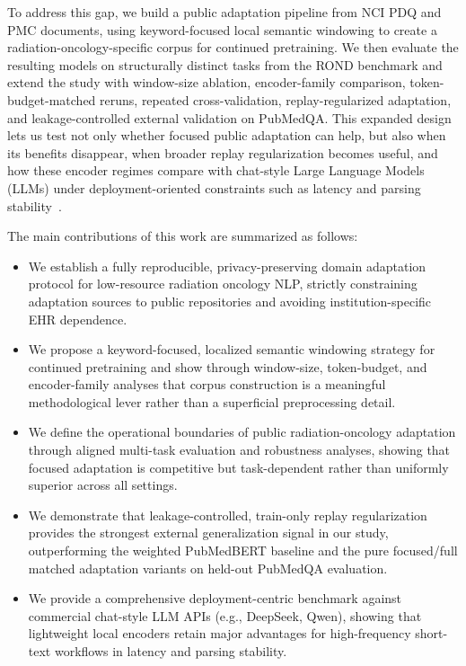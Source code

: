 \documentclass[a4paper,fleqn]{cas-dc}
\begin{document}
To address this gap, we build a public adaptation pipeline from NCI PDQ and PMC documents, using keyword-focused local semantic windowing to create a radiation-oncology-specific corpus for continued pretraining. We then evaluate the resulting models on structurally distinct tasks from the ROND benchmark and extend the study with window-size ablation, encoder-family comparison, token-budget-matched reruns, repeated cross-validation, replay-regularized adaptation, and leakage-controlled external validation on PubMedQA. This expanded design lets us test not only whether focused public adaptation can help, but also when its benefits disappear, when broader replay regularization becomes useful, and how these encoder regimes compare with chat-style Large Language Models (LLMs) under deployment-oriented constraints such as latency and parsing stability~\cite{jiang2023health, moor2023foundation}.

The main contributions of this work are summarized as follows:
\begin{itemize}
	\item We establish a fully reproducible, privacy-preserving domain adaptation protocol for low-resource radiation oncology NLP, strictly constraining adaptation sources to public repositories and avoiding institution-specific EHR dependence.
	\item We propose a keyword-focused, localized semantic windowing strategy for continued pretraining and show through window-size, token-budget, and encoder-family analyses that corpus construction is a meaningful methodological lever rather than a superficial preprocessing detail.
	\item We define the operational boundaries of public radiation-oncology adaptation through aligned multi-task evaluation and robustness analyses, showing that focused adaptation is competitive but task-dependent rather than uniformly superior across all settings.
	\item We demonstrate that leakage-controlled, train-only replay regularization provides the strongest external generalization signal in our study, outperforming the weighted PubMedBERT baseline and the pure focused/full matched adaptation variants on held-out PubMedQA evaluation.
	\item We provide a comprehensive deployment-centric benchmark against commercial chat-style LLM APIs (e.g., DeepSeek, Qwen), showing that lightweight local encoders retain major advantages for high-frequency short-text workflows in latency and parsing stability.
\end{itemize}
\end{document}
